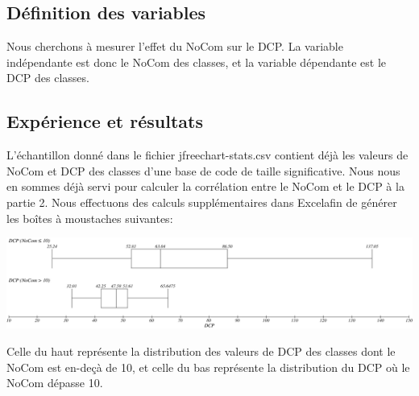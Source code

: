\documentclass{article}
\begin{document}
\subsection{Définition des variables}
Nous cherchons à mesurer l'effet du NoCom sur le DCP.
La variable indépendante est donc le NoCom des classes, et la variable dépendante est le DCP des classes.

\subsection{Expérience et résultats}
L'échantillon donné dans le fichier jfreechart-stats.csv contient déjà les valeurs de NoCom et DCP des classes d'une base de code de taille significative.
Nous nous en sommes déjà servi pour calculer la corrélation entre le NoCom et le DCP à la partie 2.
Nous effectuons des calculs supplémentaires dans Excel\footnotemark[1] afin de générer les boîtes à moustaches suivantes:\vspace{\baselineskip}

\includegraphics[width=\textwidth]{figures/t3nocom.png}\vspace{0.5em}

Celle du haut représente la distribution des valeurs de DCP des classes dont le NoCom est en-deçà de 10,
et celle du bas représente la distribution du DCP où le NoCom dépasse 10.
\end{document}
